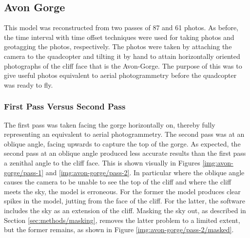 \subsection{Avon Gorge}
\label{sec:results/avon-gorge}

This model was reconstructed from two passes of 87 and 61 photos. As before, the
time interval with time offset techniques were used for taking photos and
geotagging the photos, respectively. The photos were taken by attaching the
camera to the quadcopter and tilting it by hand to attain horizontally oriented
photographs of the cliff face that is the Avon-Gorge. The purpose of this was to
give useful photos equivalent to aerial photogrammetry before the quadcopter was
ready to fly.

\subsubsection{First Pass Versus Second Pass}
\label{sec:results/avon-gorge/passes}

The first pass was taken facing the gorge horizontally on, thereby fully
representing an equivalent to aerial photogrammetry. The second pass was at an
oblique angle, facing upwards to capture the top of the gorge. As expected, the
second pass at an oblique angle produced less accurate results than the first
pass a zenithal angle to the cliff face. This is shown visually in Figures
\ref{img:avon-gorge/pass-1} and \ref{img:avon-gorge/pass-2}. In particular where
the oblique angle causes the camera to be unable to see the top of the cliff and
where the cliff meets the sky, the model is erroneous. For the former the model
produces clear spikes in the model, jutting from the face of the cliff. For the
latter, the software includes the sky as an extension of the cliff. Masking the
sky out, as described in Section \ref{sec:methods/masking}, removes the latter
problem to a limited extent, but the former remains, as shown in Figure
\ref{img:avon-gorge/pass-2/masked}.

